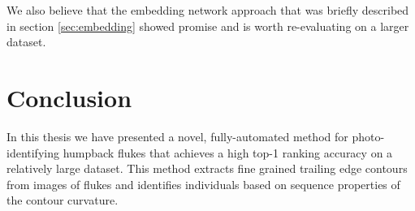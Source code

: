We also believe that the embedding network approach that was briefly described in section \ref{sec:embedding} showed promise and is worth re-evaluating on a larger dataset.

\section{Conclusion}

In this thesis we have presented a novel, fully-automated method for photo-identifying humpback flukes that achieves a high top-1 ranking accuracy on a relatively large dataset.
This method extracts fine grained trailing edge contours from images of flukes and identifies individuals based on sequence properties of the contour curvature.

